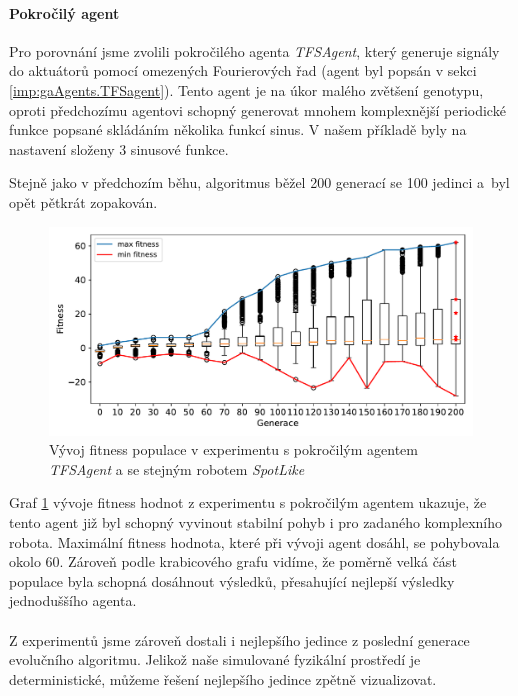 \paragraph{Pokročilý agent}
Pro porovnání jsme zvolili pokročilého agenta \emph{TFSAgent}, který generuje
signály do aktuátorů pomocí omezených Fourierových řad (agent byl popsán v
sekci \ref{imp:gaAgents.TFSagent}). Tento agent je na úkor malého zvětšení
genotypu, oproti předchozímu agentovi schopný generovat mnohem komplexnější
periodické funkce popsané skládáním několika funkcí sinus. V našem příkladě
byly na nastavení složeny $3$ sinusové funkce.

Stejně jako v předchozím běhu, algoritmus běžel 200 generací se 100 jedinci
a~byl opět pětkrát zopakován.

\begin{figure}[!h]
    \centering
    \includegraphics[width=1\textwidth]{../img/experiment1_TFS_10ticks.pdf}
    \caption{Vývoj fitness populace v experimentu s pokročilým agentem
    \emph{TFSAgent} a se stejným robotem \emph{SpotLike}}
    \label{exp:first_TFS}
\end{figure}

Graf \ref{exp:first_TFS} vývoje fitness hodnot z experimentu s pokročilým
agentem ukazuje, že tento agent již byl schopný vyvinout stabilní pohyb i pro
zadaného komplexního robota. Maximální fitness hodnota, které při vývoji agent
dosáhl, se pohybovala okolo 60. Zároveň podle krabicového grafu vidíme, že
poměrně velká část populace byla schopná dosáhnout výsledků, přesahující
nejlepší výsledky jednoduššího agenta.

\paragraph{}
Z experimentů jsme zároveň dostali i nejlepšího jedince z poslední generace
evolučního algoritmu. Jelikož naše simulované fyzikální prostředí je
deterministické, můžeme řešení nejlepšího jedince zpětně vizualizovat.

